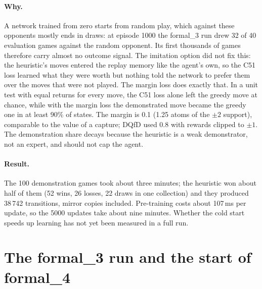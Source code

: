 \paragraph{Why.} A network trained from zero starts from random play, which against these
opponents mostly ends in draws: at episode 1000 the formal\_3 run drew 32 of 40 evaluation games
against the random opponent. Its first thousands of games therefore carry almost no outcome
signal. The imitation option did not fix this: the heuristic's moves entered the replay memory
like the agent's own, so the C51 loss learned what they were worth but nothing told the network
to prefer them over the moves that were not played. The margin loss does exactly that. In a unit
test with equal returns for every move, the C51 loss alone left the greedy move at chance, while
with the margin loss the demonstrated move became the greedy one in at least 90\% of states.
The margin is 0.1 (1.25 atoms of the $\pm 2$ support), comparable to the value of a capture; DQfD
used 0.8 with rewards clipped to $\pm 1$. The demonstration share decays because the heuristic is
a weak demonstrator, not an expert, and should not cap the agent.

\paragraph{Result.} The 100 demonstration games took about three minutes; the heuristic won
about half of them (52 wins, 26 losses, 22 draws in one collection) and they produced 38\,742
transitions, mirror copies included. Pre-training costs about 107\,ms per update, so the 5000
updates take about nine minutes. Whether the cold start speeds up learning has not yet been
measured in a full run.

\section{The formal\_3 run and the start of formal\_4}

